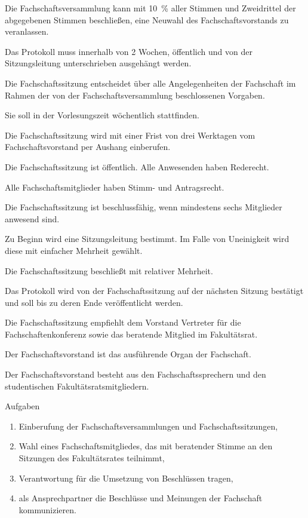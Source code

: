 \documentclass[a4paper, parskip=half, numbers=noenddot]{scrartcl}
\begin{document}
\begin{contract}
Die Fachschaftsversammlung kann mit 10~\% aller Stimmen und Zweidrittel der abgegebenen Stimmen be\-schlie\-ßen, eine Neuwahl des Fach\-schaftsvor\-stands zu veranlassen\label{fachschaft:vv:wahl}.

Das Protokoll muss innerhalb von 2 Wochen, öffentlich und von der Sitzungsleitung unterschrieben ausgehängt werden.

\enlargethispage*{\baselineskip}
\pagebreak


%
%

%
\label{fs:sitzung}

Die Fachschaftssitzung entscheidet über alle Angelegenheiten der Fachschaft im Rahmen der von der Fachschaftsversammlung beschlossenen Vorgaben.

Sie soll in der Vorlesungszeit wöchentlich stattfinden.

Die Fachschaftssitzung wird mit einer Frist von drei Werktagen vom Fachschaftsvorstand per Aushang einberufen.

Die Fachschaftssitzung ist öffentlich. Alle Anwesenden haben Rederecht.

Alle Fachschaftsmitglieder haben Stimm- und Antragsrecht.

Die Fachschaftssitzung ist beschlussfähig, wenn mindestens sechs Mitglieder anwesend sind.

Zu Beginn wird eine Sitzungsleitung bestimmt. Im Falle von Uneinigkeit wird diese mit einfacher Mehrheit gewählt.

Die Fachschaftssitzung beschließt mit relativer Mehrheit.

Das Protokoll wird von der Fachschaftssitzung auf der nächsten Sitzung bestätigt und soll bis zu deren Ende veröffentlicht werden.

Die Fachschaftssitzung empfiehlt dem Vorstand Vertreter für die Fachschaftenkonferenz sowie das beratende Mitglied im Fakultätsrat.


%
%

%
\label{fs:vorstand}

Der Fachschaftsvorstand ist das ausführende Organ der Fachschaft.

Der Fachschaftsvorstand besteht aus den Fachschaftssprechern und den studentischen Fakultäts\-ratsmitgliedern.

Aufgaben
\begin{enumerate}
\item Einberufung der Fachschaftsversammlungen und Fachschaftssitzungen,
\item Wahl eines Fachschaftsmitgliedes, das mit beratender Stimme an den Sitzungen des Fakultäts\-rates teilnimmt,
\item Verantwortung für die Umsetzung von Beschlüssen tragen,
\item als Ansprechpartner die Beschlüsse und Meinungen der Fachschaft kommunizieren.
\end{enumerate}


\end{contract}
\end{document}
